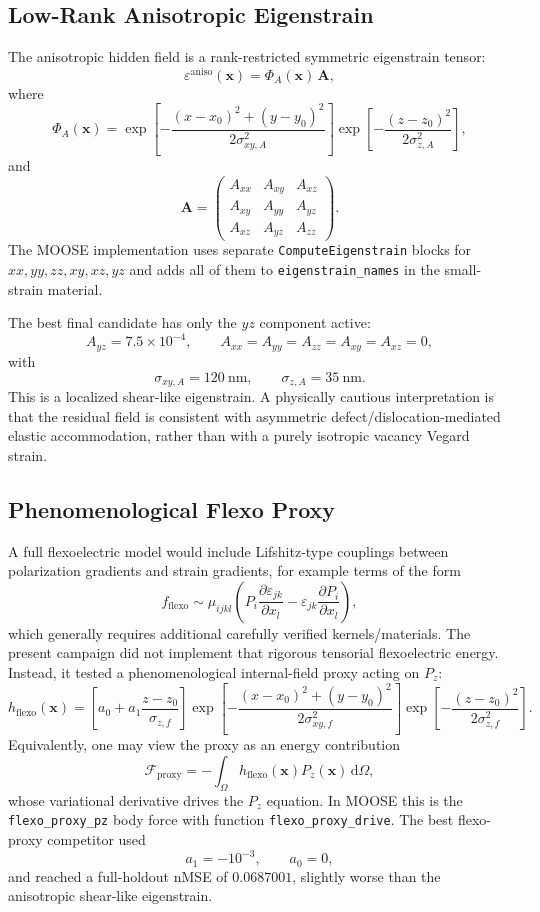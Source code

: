 \documentclass[11pt]{article}
\newcommand{\vect}[1]{\bm{#1}}
\newcommand{\dd}{\mathrm{d}}
\newcommand{\eps}{\varepsilon}
\begin{document}
\subsection{Low-Rank Anisotropic Eigenstrain}

The anisotropic hidden field is a rank-restricted symmetric eigenstrain tensor:
\[
  \eps^{\mathrm{aniso}}(\vect{x})
  =
  \Phi_A(\vect{x})\,\vect{A},
\]
where
\[
  \Phi_A(\vect{x})
  =
  \exp\left[
    -\frac{(x-x_0)^2+(y-y_0)^2}{2\sigma_{xy,A}^2}
  \right]
  \exp\left[
    -\frac{(z-z_0)^2}{2\sigma_{z,A}^2}
  \right],
\]
and
\[
  \vect{A}
  =
  \begin{pmatrix}
    A_{xx} & A_{xy} & A_{xz}\\
    A_{xy} & A_{yy} & A_{yz}\\
    A_{xz} & A_{yz} & A_{zz}
  \end{pmatrix}.
\]
The MOOSE implementation uses separate \texttt{ComputeEigenstrain} blocks for
\(xx,yy,zz,xy,xz,yz\) and adds all of them to
\texttt{eigenstrain\_names} in the small-strain material.

The best final candidate has only the \(yz\) component active:
\[
  A_{yz}=7.5\times 10^{-4},
  \qquad
  A_{xx}=A_{yy}=A_{zz}=A_{xy}=A_{xz}=0,
\]
with
\[
  \sigma_{xy,A}=120~\mathrm{nm},\qquad
  \sigma_{z,A}=35~\mathrm{nm}.
\]
This is a localized shear-like eigenstrain.  A physically cautious
interpretation is that the residual field is consistent with asymmetric
defect/dislocation-mediated elastic accommodation, rather than with a purely
isotropic vacancy Vegard strain.

\subsection{Phenomenological Flexo Proxy}

A full flexoelectric model would include Lifshitz-type couplings between
polarization gradients and strain gradients, for example terms of the form
\[
  f_{\mathrm{flexo}}
  \sim
  \mu_{ijkl}
  \left(
    P_i\frac{\partial \eps_{jk}}{\partial x_l}
    -
    \eps_{jk}\frac{\partial P_i}{\partial x_l}
  \right),
\]
which generally requires additional carefully verified kernels/materials.
The present campaign did not implement that rigorous tensorial flexoelectric
energy.  Instead, it tested a phenomenological internal-field proxy acting on
\(P_z\):
\[
  h_{\mathrm{flexo}}(\vect{x})
  =
  \left[
    a_0 + a_1\frac{z-z_0}{\sigma_{z,f}}
  \right]
  \exp\left[
    -\frac{(x-x_0)^2+(y-y_0)^2}{2\sigma_{xy,f}^2}
  \right]
  \exp\left[
    -\frac{(z-z_0)^2}{2\sigma_{z,f}^2}
  \right].
\]
Equivalently, one may view the proxy as an energy contribution
\[
  \mathcal{F}_{\mathrm{proxy}}
  =
  -\int_{\Omega} h_{\mathrm{flexo}}(\vect{x})P_z(\vect{x})\,\dd\Omega ,
\]
whose variational derivative drives the \(P_z\) equation.  In MOOSE this is
the \texttt{flexo\_proxy\_pz} body force with function
\texttt{flexo\_proxy\_drive}.  The best flexo-proxy competitor used
\[
  a_1=-10^{-3},\qquad a_0=0,
\]
and reached a full-holdout nMSE of \(0.0687001\), slightly worse than the
anisotropic shear-like eigenstrain.
\end{document}
